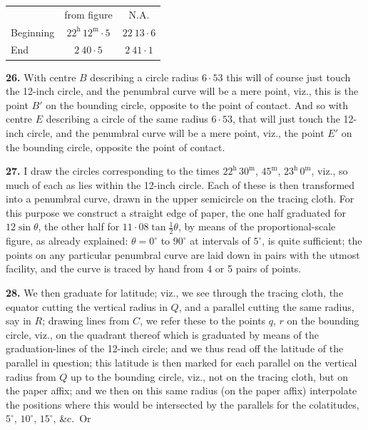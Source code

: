 \documentclass[11pt]{article}
\begin{document}
\smallskip

\begin{center}
\begin{tabular}{lcc}
 & from figure & N.A. \\
Beginning & $22^{\mathrm{h}}\,12^{\mathrm{m}}{\cdot}5$ & $22\ 13{\cdot}6$\\
End & $2\ 40{\cdot}5$ & $2\ 41{\cdot}1$\\
\end{tabular}
\end{center}

\medskip

\textbf{26.} With centre $B$ describing a circle radius $6{\cdot}53$ this
will of course just touch the 12-inch circle, and the penumbral curve
will be a mere point, viz., this is the point $B'$ on the bounding circle,
opposite to the point of contact. And so with centre $E$ describing a
circle of the same radius $6{\cdot}53$, that will just touch the 12-inch
circle, and the penumbral curve will be a mere point, viz., the point
$E'$ on the bounding circle, opposite the point of contact.

\medskip

\textbf{27.} I draw the circles corresponding to the times $22^{\mathrm{h}}\,30^{\mathrm{m}}$,
$45^{\mathrm{m}}$, $23^{\mathrm{h}}\,0^{\mathrm{m}}$, viz., so much of
each as lies within the 12-inch circle. Each of these is then transformed
into a penumbral curve, drawn in the upper semicircle on the tracing
cloth. For this purpose we construct a straight edge of paper, the one
half graduated for $12\sin\theta$, the other half for
$11{\cdot}08\tan\tfrac{1}{2}\theta$, by means of the proportional-scale
figure, as already explained: $\theta = 0^{\circ}$ to $90^{\circ}$ at
intervals of $5^{\circ}$, is quite sufficient; the points on any
particular penumbral curve are laid down in pairs with the utmost
facility, and the curve is traced by hand from 4 or 5 pairs of points.

\medskip

\textbf{28.} We then graduate for latitude; viz., we see through the
tracing cloth, the equator cutting the vertical radius in $Q$, and a
parallel cutting the same radius, say in $R$; drawing lines from $C$, we
refer these to the points $q$, $r$ on the bounding circle, viz., on the
quadrant thereof which is graduated by means of the graduation-lines of
the 12-inch circle; and we thus read off the latitude of the parallel in
question; this latitude is then marked for each parallel on the vertical
radius from $Q$ up to the bounding circle, viz., not on the tracing
cloth, but on the paper affix; and we then on this same radius (on the
paper affix) interpolate the positions where this would be intersected
by the parallels for the colatitudes, $5^{\circ}$, $10^{\circ}$,
$15^{\circ}$, \&c.\ Or
\end{document}
